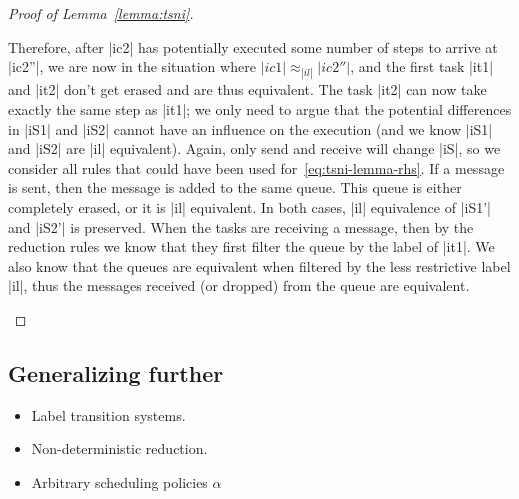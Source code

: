 \begin{proof}[Proof of Lemma~\ref{lemma:tsni}]
\begin{itemize}
    Therefore, after |ic2| has potentially executed some number of steps
    to arrive at |ic2''|, we are now in the situation where $|ic1|\approx_{|il|}|ic2''|$, and the first task |it1| and |it2| don't
    get erased and are thus equivalent.
    The task |it2| can now take exactly the same step as |it1|;  we only
    need to argue that the potential differences in |iS1| and |iS2| cannot
    have an influence on the execution (and we know |iS1| and |iS2| are
    |il| equivalent).
    Again, only send and receive will change |iS|, so we consider all
    rules that could have been used for~\eqref{eq:tsni-lemma-rhs}.  If
    a message is sent, then the message is added to the same queue.  This
    queue is either completely erased, or it is |il| equivalent.  In both
    cases, |il| equivalence of |iS1'| and |iS2'| is preserved.
    When the tasks are receiving a message, then by the reduction rules
    we know that they first filter the queue by the label of |it1|.  We
    also know that the queues are equivalent when filtered by the less
    restrictive label |il|, thus the messages received (or dropped) from the
    queue are equivalent.
  \end{itemize}
\end{proof}

\subsection{Generalizing further}

\begin{itemize}
\item Label transition systems.
\item Non-deterministic reduction.
\item Arbitrary scheduling policies $\alpha$
\end{itemize}











